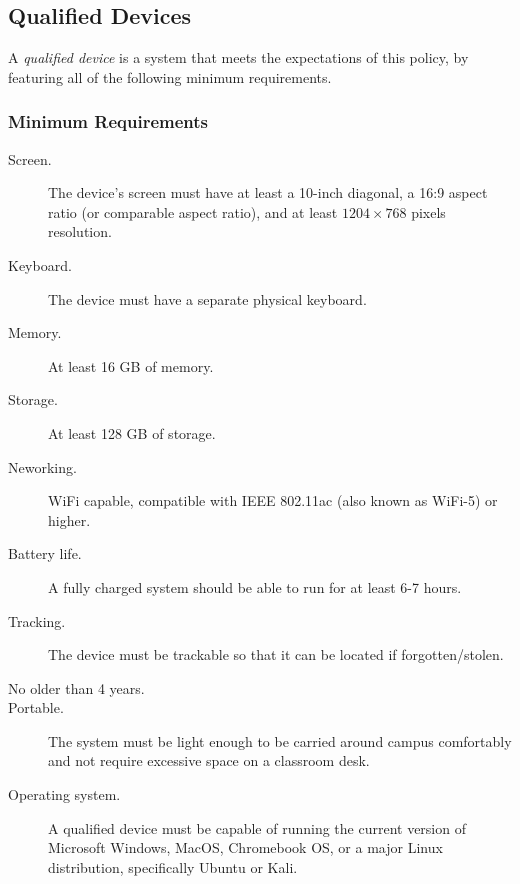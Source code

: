 \subsection*{Qualified Devices}

A \emph{qualified device} is a system that meets the expectations of this policy, by featuring all of the following minimum requirements.

\subsubsection*{Minimum Requirements}
    
\begin{description}

    \item [Screen.] The device's screen must have at least a 10-inch diagonal, a 16:9 aspect ratio (or comparable aspect ratio), and at least $1204\times 768$ pixels resolution.

    \item [Keyboard.] The device must have a separate physical keyboard. 

    \item[Memory.] At least 16 GB of memory.

    \item[Storage.] At least 128 GB of storage.

    \item[Neworking.] WiFi capable, compatible with IEEE 802.11ac (also known as WiFi-5) or higher.

    \item[Battery life.] A fully charged system should be able to run for at least 6-7 hours.

    \item[Tracking.] The device must be trackable so that it can be located if forgotten/stolen.

    \item[No older than 4 years.]

    \item[Portable.] The system must be light enough to be carried around campus comfortably and not require excessive space on a classroom desk.

    \item[Operating system.] A qualified device must be capable of running the current version of Microsoft Windows, MacOS, Chromebook OS, or a major Linux distribution, specifically Ubuntu or Kali.


\end{description}
